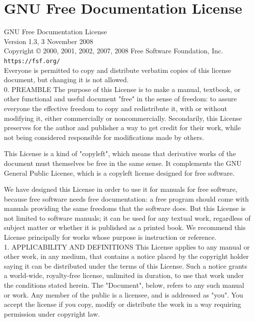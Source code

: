 \documentclass[10pt,a4paper]{article}
\begin{document}
\section{GNU Free Documentation License}
\begin{scriptsize}
GNU Free Documentation License\\

Version 1.3, 3 November 2008\\

Copyright © 2000, 2001, 2002, 2007, 2008 Free Software Foundation, Inc. \texttt{https://fsf.org/}\\

Everyone is permitted to copy and distribute verbatim copies of this license document, but changing it is not allowed.\\


0. PREAMBLE
The purpose of this License is to make a manual, textbook, or other functional and useful document "free" in the sense of freedom: to assure everyone the effective freedom to copy and redistribute it, with or without modifying it, either commercially or noncommercially. Secondarily, this License preserves for the author and publisher a way to get credit for their work, while not being considered responsible for modifications made by others.

This License is a kind of "copyleft", which means that derivative works of the document must themselves be free in the same sense. It complements the GNU General Public License, which is a copyleft license designed for free software.

We have designed this License in order to use it for manuals for free software, because free software needs free documentation: a free program should come with manuals providing the same freedoms that the software does. But this License is not limited to software manuals; it can be used for any textual work, regardless of subject matter or whether it is published as a printed book. We recommend this License principally for works whose purpose is instruction or reference.\\

1. APPLICABILITY AND DEFINITIONS
This License applies to any manual or other work, in any medium, that contains a notice placed by the copyright holder saying it can be distributed under the terms of this License. Such a notice grants a world-wide, royalty-free license, unlimited in duration, to use that work under the conditions stated herein. The "Document", below, refers to any such manual or work. Any member of the public is a licensee, and is addressed as "you". You accept the license if you copy, modify or distribute the work in a way requiring permission under copyright law.


\end{scriptsize}
\end{document}

